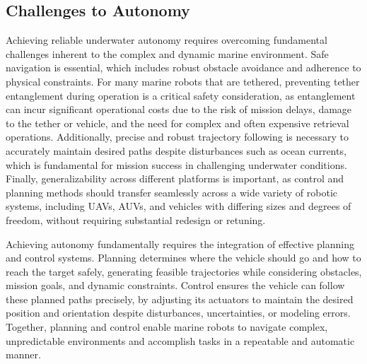 \subsection{Challenges to Autonomy}
Achieving reliable underwater autonomy requires overcoming fundamental challenges inherent to the complex and dynamic marine environment. Safe navigation is essential, which includes robust obstacle avoidance and adherence to physical constraints. For many marine robots that are tethered, preventing tether entanglement during operation is a critical safety consideration, as entanglement can incur significant operational costs due to the risk of mission delays, damage to the tether or vehicle, and the need for complex and often expensive retrieval operations. Additionally, precise and robust trajectory following is necessary to accurately maintain desired paths despite disturbances such as ocean currents, which is fundamental for mission success in challenging underwater conditions. Finally, generalizability across different platforms is important, as control and planning methods should transfer seamlessly across a wide variety of robotic systems, including UAVs, AUVs, and vehicles with differing sizes and degrees of freedom, without requiring substantial redesign or retuning.

Achieving autonomy fundamentally requires the integration of effective planning and control systems. Planning determines where the vehicle should go and how to reach the target safely, generating feasible trajectories while considering obstacles, mission goals, and dynamic constraints. Control ensures the vehicle can follow these planned paths precisely, by adjusting its actuators to maintain the desired position and orientation despite disturbances, uncertainties, or modeling errors. Together, planning and control enable marine robots to navigate complex, unpredictable environments and accomplish tasks in a repeatable and automatic manner.

















